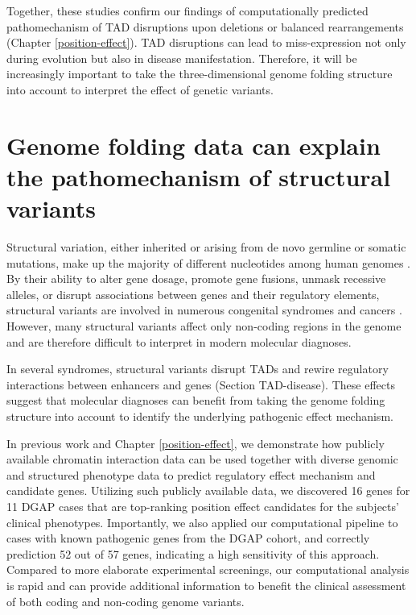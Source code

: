 \documentclass[a4paper,twoside=true,openright,parskip=full,chapterprefix=true,11pt,headings=normal,bibliography=totoc,listof=totoc,titlepage=on,captions=tableabove,draft=false]{scrreprt}
\theoremstyle{definition}
\theoremstyle{definition}
\theoremstyle{definition}
\theoremstyle{remark}
\begin{document}
Together, these studies confirm our findings of computationally
predicted pathomechanism of TAD disruptions upon deletions
\citep{Ibn-Salem2014} or balanced rearrangements (Chapter
\ref{position-effect}). TAD disruptions can lead to miss-expression not
only during evolution but also in disease manifestation. Therefore, it
will be increasingly important to take the three-dimensional genome
folding structure into account to interpret the effect of genetic
variants.

\hypertarget{genome-folding-data-can-explain-the-pathomechanism-of-structural-variants}{%
\section{Genome folding data can explain the pathomechanism of
structural
variants}\label{genome-folding-data-can-explain-the-pathomechanism-of-structural-variants}}

Structural variation, either inherited or arising from de novo germline
or somatic mutations, make up the majority of different nucleotides
among human genomes \citep{Sudmant2015, Auton2015}. By their ability to
alter gene dosage, promote gene fusions, unmask recessive alleles, or
disrupt associations between genes and their regulatory elements,
structural variants are involved in numerous congenital syndromes and
cancers \citep{Stankiewicz2010}. However, many structural variants
affect only non-coding regions in the genome and are therefore difficult
to interpret in modern molecular diagnoses.

In several syndromes, structural variants disrupt TADs and rewire
regulatory interactions between enhancers and genes (Section
TAD-disease). These effects suggest that molecular diagnoses can benefit
from taking the genome folding structure into account to identify the
underlying pathogenic effect mechanism.

In previous work \citep{Ibn-Salem2014} and Chapter
\ref{position-effect}, we demonstrate how publicly available chromatin
interaction data can be used together with diverse genomic and
structured phenotype data to predict regulatory effect mechanism and
candidate genes. Utilizing such publicly available data, we discovered
16 genes for 11 DGAP cases that are top-ranking position effect
candidates for the subjects' clinical phenotypes. Importantly, we also
applied our computational pipeline to cases with known pathogenic genes
from the DGAP cohort, and correctly prediction 52 out of 57 genes,
indicating a high sensitivity of this approach. Compared to more
elaborate experimental screenings, our computational analysis is rapid
and can provide additional information to benefit the clinical
assessment of both coding and non-coding genome variants.
\end{document}
